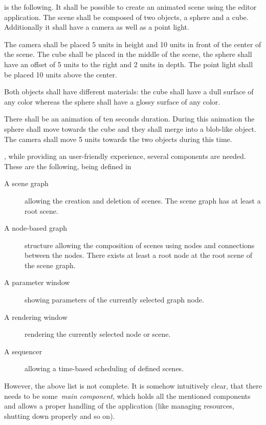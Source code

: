 \documentclass[%
    a4paper,    %
    justified,  %
    nobib,      %
    openany     %
]{tufte-book}
\begin{document}
 is the following.
It shall be possible to create an animated scene using the editor application.
The scene shall be composed of two objects, a sphere and a cube. Additionally it
shall have a camera as well as a point light.

The camera shall be placed 5 units in height and 10 units in front of the center
of the scene. The cube shall be placed in the middle of the scene, the sphere
shall have an offset of 5 units to the right and 2 units in depth. The point
light shall be placed 10 units above the center.

Both objects shall have different materials: the cube shall have a dull surface
of any color whereas the sphere shall have a glossy surface of any color.

There shall be an animation of ten seconds duration. During this animation the
sphere shall move towards the cube and they shall merge into a blob-like object.
The camera shall move 5 units towards the two objects during this time.

, while providing an user-friendly
experience, several components are needed. These are the following, being
defined in~~\cite{osterwalder-qde-2016}

\begin{description}
  \item[A scene graph] allowing the creation and deletion of scenes. The scene
    graph has at least a root scene.
  \item[A node-based graph] structure allowing the composition of scenes using
    nodes and connections between the nodes. There exists at least a root node
    at the root scene of the scene graph.
  \item[A parameter window] showing parameters of the currently selected graph
    node.
  \item[A rendering window] rendering the currently selected node or scene.
  \item[A sequencer] allowing a time-based scheduling of defined scenes.
\end{description}

However, the above list is not complete. It is somehow intuitively clear, that
there needs to be some~\emph{main component}, which holds all the mentioned
components and allows a proper handling of the application (like managing
resources, shutting down properly and so on).
\end{document}

